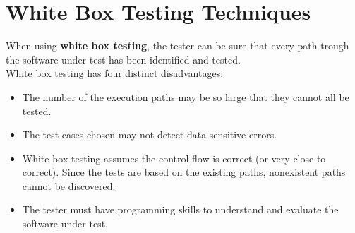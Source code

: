 \documentclass{article}
\begin{document}
\section*{White Box Testing Techniques}
When using \textbf{white box testing}, the tester can be sure that every path trough the software under test has been identified and tested.
\\
White box testing has four distinct disadvantages:
\begin{itemize}
\item The number of the execution paths may be so large that they cannot all be tested.
\item The test cases chosen may not detect data sensitive errors.
\item White box testing assumes the control flow is correct (or very close to correct). Since the tests are based on the existing paths, nonexistent paths cannot be discovered.
\item The tester must have programming skills to understand and evaluate the software under test.
\end{itemize}
\end{document}
